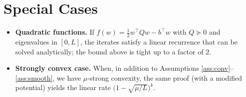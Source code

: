 \documentclass{article}
\begin{document}
\section*{Special Cases}
\begin{itemize}
\item \textbf{Quadratic functions.}  If \(f(w)=\tfrac12 w^\top Q w-b^\top w\)
with \(Q\succeq 0\) and eigenvalues in \([0,L]\), the iterates satisfy a
linear recurrence that can be solved analytically; the bound above is
tight up to a factor of \(2\).
\item \textbf{Strongly convex case.}  When, in addition to Assumptions
\ref{ass:conv}–\ref{ass:smooth}, we have \(\mu\)-strong convexity,
the same proof (with a modified potential) yields the linear rate
\(\bigl(1-\sqrt{\mu/L}\bigr)^k\).
\end{itemize}
\end{document}
